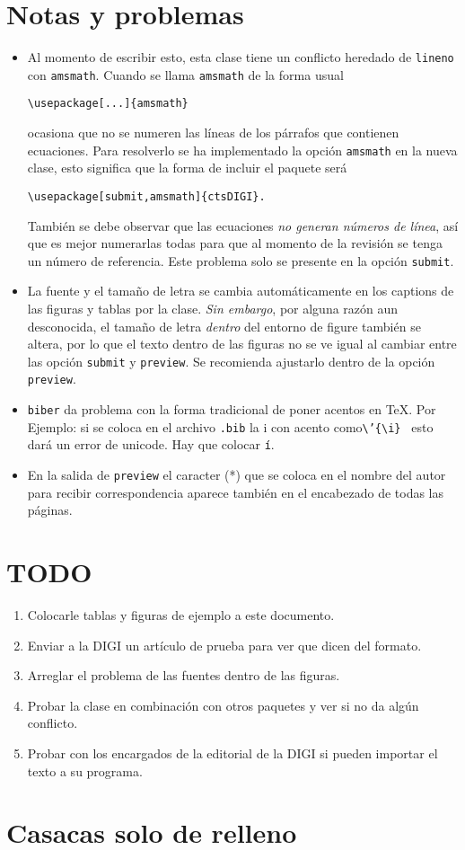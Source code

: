 \documentclass{article}
\begin{document}
\section{Notas y problemas}
\begin{itemize}
\item Al momento de escribir esto, esta clase tiene un conflicto heredado de \texttt{lineno} con  \texttt{amsmath}. Cuando se llama \texttt{amsmath} de la forma usual
\begin{verbatim}
\usepackage[...]{amsmath}
\end{verbatim}
ocasiona que no se numeren las líneas de los párrafos que contienen ecuaciones. Para resolverlo se ha implementado la opción \texttt{amsmath} en la nueva clase, esto significa que la forma de incluir el paquete será
\begin{verbatim}
\usepackage[submit,amsmath]{ctsDIGI}.
\end{verbatim}
También se debe observar que las ecuaciones \emph{no generan números de línea}, así que es mejor numerarlas todas para que al momento de la revisión se tenga un número de referencia. Este problema solo se presente en la opción \texttt{submit}.

\item La fuente y el tamaño de letra se cambia automáticamente en los captions de las figuras y tablas por la clase. \emph{Sin embargo}, por alguna razón aun desconocida, el tamaño de letra \emph{dentro} del entorno de figure también se altera, por lo que el texto dentro de las figuras no se ve igual al cambiar entre las opción \texttt{submit} y \texttt{preview}. Se recomienda ajustarlo dentro de la opción \texttt{preview}.

\item \texttt{biber} da problema con la forma tradicional de poner acentos en \TeX. Por Ejemplo: si se coloca en el archivo \texttt{.bib} la i con acento como\texttt{\textbackslash'\{\textbackslash i\} } esto dará un error de unicode. Hay que colocar \texttt{í}.

\item En la salida de \texttt{preview} el caracter (*) que se coloca en el nombre del autor para recibir correspondencia aparece también en el encabezado de todas las páginas.

\end{itemize}

\section{TODO}
\begin{enumerate}
\item Colocarle tablas y figuras de ejemplo a este documento.
\item Enviar a la DIGI un artículo de prueba para ver que dicen del formato.
\item Arreglar el problema de las fuentes dentro de las figuras.
\item Probar la clase en combinación con otros paquetes y ver si no da algún conflicto.
\item Probar con los encargados de la editorial de la DIGI si pueden importar el texto a su programa.
\end{enumerate}

\section{Casacas solo de relleno}
\lipsum



 
\end{document}
